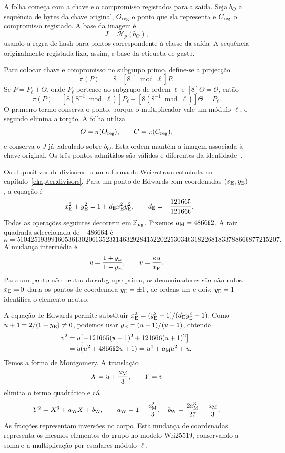 
A folha começa com a chave e o compromisso registados para
a saída. Seja \(b_O\) a sequência de bytes da chave original,
\(O_{\rm reg}\) o ponto que ela representa e \(C_{\rm reg}\)
o compromisso registado. A base da imagem é
\[
 J=\mathcal H_p(b_O),
\]
usando a regra de hash para pontos correspondente à classe
da saída. A sequência originalmente registada fixa, assim,
a base da etiqueta de gasto.

Para colocar chave e compromisso no subgrupo primo, define-se
a projecção
\[
 \pi(P)=[8]\,[8^{-1}\bmod\ell]P.
\]
Se \(P=P_\ell+\Theta\), onde \(P_\ell\) pertence ao subgrupo
de ordem \(\ell\) e \([8]\Theta=\mathcal O\), então
\[
 \pi(P)=[8(8^{-1}\bmod\ell)]P_\ell
             +[8(8^{-1}\bmod\ell)]\Theta=P_\ell.
\]
O primeiro termo conserva o ponto, porque o multiplicador
vale um módulo \(\ell\); o segundo elimina a torção.
A folha utiliza
\[
 O=\pi(O_{\rm reg}),\qquad C=\pi(C_{\rm reg}),
\]
e conserva o \(J\) já calculado sobre \(b_O\).
Esta ordem mantém a imagem associada à chave original.
Os três pontos admitidos são válidos e diferentes da
identidade~\cite{monero-source-current-fcmp-tree}.

Os dispositivos de divisores usam a forma de Weierstrass
estudada no capítulo~\ref{chapter:divisors}. Para um ponto de
Edwards com coordenadas \((x_{\rm E},y_{\rm E})\), a equação é
\[
 -x_{\rm E}^2+y_{\rm E}^2
    =1+d_{\rm E}x_{\rm E}^2y_{\rm E}^2,
 \qquad d_{\rm E}=-\frac{121665}{121666}.
\]
Todas as operações seguintes decorrem em \(\mathbb F_{p_{\rm E}}\).
Fixemos \(a_{\rm M}=486662\). A raiz quadrada seleccionada
de \(-486664\) é
\[
 \kappa=
 51042569399160536130206135233146329284152202253034631822681833788666877215207.
\]
A mudança intermédia é
\[
 u=\frac{1+y_{\rm E}}{1-y_{\rm E}},\qquad
 v=\frac{\kappa u}{x_{\rm E}}.
\]
Para um ponto não neutro do subgrupo primo, os denominadores
são não nulos: \(x_{\rm E}=0\) daria os pontos de coordenada
\(y_{\rm E}=\pm1\), de ordens um e dois; \(y_{\rm E}=1\)
identifica o elemento neutro.

A equação de Edwards permite substituir
\(x_{\rm E}^2=(y_{\rm E}^2-1)/(d_{\rm E}y_{\rm E}^2+1)\).
Como \(u+1=2/(1-y_{\rm E})\ne0\), podemos usar
\(y_{\rm E}=(u-1)/(u+1)\), obtendo
\[
 \begin{aligned}
 v^2
 &=u\bigl[-121665(u-1)^2+121666(u+1)^2\bigr]\\
 &=u(u^2+486662u+1)=u^3+a_{\rm M}u^2+u.
 \end{aligned}
\]
Temos a forma de Montgomery. A translação
\[
 X=u+\frac{a_{\rm M}}3,\qquad Y=v
\]
elimina o termo quadrático e dá
\begin{equation}
 Y^2=X^3+a_{\rm W}X+b_{\rm W},\qquad
 a_{\rm W}=1-\frac{a_{\rm M}^2}{3},\quad
 b_{\rm W}=\frac{2a_{\rm M}^3}{27}-\frac{a_{\rm M}}3.
 \label{eq:fcmp-wei-model}
\end{equation}
As fracções representam inversões no corpo. Esta mudança de
coordenadas representa os mesmos elementos do grupo no
modelo Wei25519, conservando a soma e a multiplicação por
escalares módulo \(\ell\).

